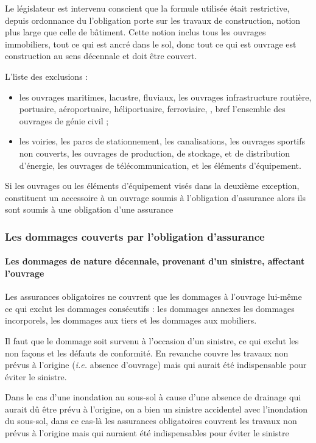 			Le législateur est intervenu conscient que la formule utilisée était restrictive, depuis ordonnance du  l’obligation porte sur les travaux de construction, notion plus large que celle de bâtiment.
			Cette notion inclus tous les ouvrages immobiliers, \CAD tout ce qui est ancré dans le sol, donc tout ce qui est ouvrage est construction au sens décennale et doit être couvert.

			L'liste des exclusions :
			\begin{itemize}
				\item les ouvrages maritimes, lacustre, fluviaux, les ouvrages infrastructure routière, portuaire, aéroportuaire, héliportuaire, ferroviaire, \etc, bref l'ensemble des ouvrages de génie civil ;
				\item les voiries, les parcs de stationnement, les canalisations, les ouvrages sportifs non couverts, les ouvrages de production, de stockage, et de distribution d’énergie, les ouvrages de télécommunication, et les éléments d’équipement.
			\end{itemize}

			Si les ouvrages ou les éléments d’équipement visés dans la deuxième exception, constituent un accessoire à un ouvrage soumis à l’obligation d’assurance alors ils sont soumis à une obligation d’une assurance

		\subsubsection{Les dommages couverts par l'obligation d'assurance}

			\paragraph{Les dommages de nature décennale, provenant d'un sinistre, affectant l'ouvrage}

				Les assurances obligatoires ne couvrent que les dommages à l’ouvrage lui-même ce qui exclut les dommages consécutifs : les dommages annexes \CAD les dommages incorporels, les dommages aux tiers et les dommages aux mobiliers.

				Il faut que le dommage soit survenu à l'occasion d'un sinistre, ce qui exclut les non façons et les défauts de conformité.
				En revanche couvre les travaux non prévus à l'origine (\emph{i.e.} absence d'ouvrage) mais qui aurait été indispensable pour éviter le sinistre.
				\begin{exemple}
					Dans le cas d'une inondation au sous-sol à cause d’une absence de drainage qui aurait dû être prévu à l’origine, on a bien un sinistre accidentel avec l’inondation du sous-sol, dans ce cas-là les assurances obligatoires couvrent les travaux non prévus à l’origine mais qui auraient été indispensables pour éviter le sinistre
				\end{exemple}

